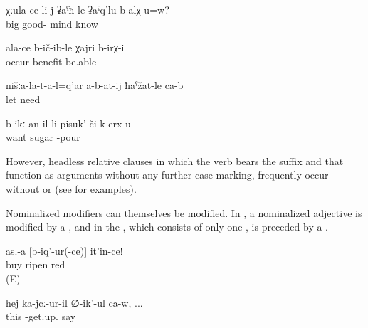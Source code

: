 \begin{exe}

	\ex	\label{ex:Does an older (person) know it better, (or a young guy)}
	\gll	χːula-ce-li-j	ʡaˁħ-le	ʡaˁq'lu	b-alχ-u=w?\\
		big	good-	mind	know\\
	\glt	{}

	\ex	\label{ex:(I) could profit from yours}
	\gll	ala-ce	b-ič-ib-le	χajri	b-irχ-i\\
			occur	benefit	be.able\\
	\glt	{}
	
	\ex	\label{ex:‎‎‎Ours should not be let. (i.e. our people should not be allowed to sell our land)}
	\gll	nišːa-la-t-a-l=q'ar	a-b-at-ij	ħaˁžat-le	ca-b\\
			let	need	\\
	\glt	{}

	\ex	\label{ex:Who wants to pours sugar (on the dish)}
	\gll	b-ikː-an-il-li	pisuk'	či-k-erx-u\\
		want	sugar	-pour\\
	\glt	{}
\end{exe}

However, headless relative clauses in which the verb bears the  suffix  and that function as  arguments without any further case marking, frequently occur without  or  (see  for examples).

Nominalized modifiers can themselves be modified. In , a nominalized adjective is modified by a , and in  the , which consists of only one , is preceded by a .


\begin{exe}
	\ex	\label{ex:Buy a ripe red one minor2}
	\gll	asː-a	[b-iq'-ur(-ce)]	it'in-ce!\\
		buy	ripen	red\\
	\glt	{} (E)
	
		\ex	\label{ex:The one who is standing says2}
	\gll	hej	ka-jcː-ur-il	∅-ik'-ul	ca-w, ...\\
		this	-get.up.	say	 \\
	\glt	{}
	
	
\end{exe}



